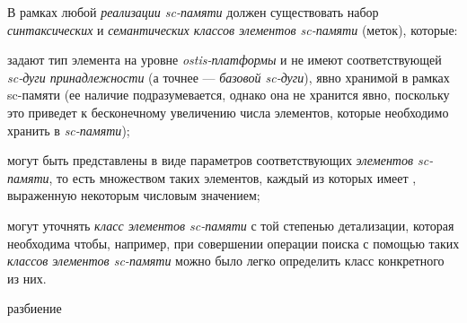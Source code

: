 \begin{SCn}
\begin{scnindent}
\end{scnindent}
\begin{scnindent}
\end{scnindent}
\end{SCn}

В рамках любой \textit{реализации sc-памяти} должен существовать набор \textit{синтаксических} и \textit{семантических классов элементов sc-памяти\scnsupergroupsign} (меток), которые:
\begin{textitemize}
    \item задают тип элемента на уровне \textit{ostis-платформы} и не имеют соответствующей \textit{sc-дуги принадлежности} (а точнее --- \textit{базовой sc-дуги}), явно хранимой в рамках sc-памяти (ее наличие подразумевается, однако она не хранится явно, поскольку это приведет к бесконечному увеличению числа элементов, которые необходимо хранить в \textit{sc-памяти});
    \item могут быть представлены в виде параметров соответствующих \textit{элементов sc-памяти}, то есть множеством таких элементов, каждый из которых имеет , выраженную некоторым числовым значением;
    \item могут уточнять \textit{класс элементов sc-памяти} с той степенью детализации, которая необходима чтобы, например, при совершении операции поиска с помощью таких \textit{классов элементов sc-памяти\scnsupergroupsign} можно было легко определить класс конкретного из них.
\end{textitemize}

\begin{SCn}
\begin{scnindent}
\end{scnindent}
\begin{scnindent}
\end{scnindent}
\begin{scnrelfromset}{разбиение}
\end{scnrelfromset}
\end{SCn}

